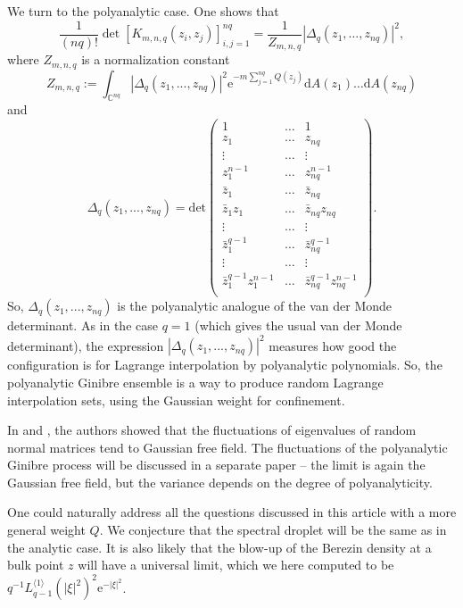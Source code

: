 \documentclass{birkart}
\theoremstyle{definition}
\theoremstyle{remark}
\numberwithin{equation}{section}
\numberwithin{figure}{section}
\newcommand{\e}{\mathrm e}
\newcommand{\1}{{\mathbf 1}}
\newcommand{\Rpar}{q}
\newcommand{\C}{{\mathbb C}}
\newcommand{\diff}{{\mathrm d}}
\begin{document}
We turn to the polyanalytic case. One shows that 
\[ 
\frac{1}{(n\Rpar)!} \det[K_{m,n,\Rpar}(z_i,z_j)]_{i,j=1}^{n\Rpar} 
= \frac{1}{Z_{m,n,\Rpar}}| \Delta_\Rpar(z_1,...,z_{n\Rpar})|^2, \]
where $Z_{m,n,\Rpar}$ is a normalization constant  
\[ 
Z_{m,n,\Rpar}:=
\int_{\C^{n\Rpar}}|\Delta_\Rpar(z_1,...,z_{n\Rpar})|^2
\e^{-m \sum_{j=1}^{n\Rpar}Q(z_j)}
\diff A(z_1) \dots \diff A(z_{n\Rpar})
\]
and 
\[ 
\Delta_\Rpar(z_1,...,z_{n\Rpar}) = 
\mathrm{det} \left( 
\begin{array}{ccc}
1 & \dots  & 1 
\\
z_1 & \dots & z_{n\Rpar} 
\\
\vdots & \dots & \vdots 
\\
z_1^{n-1} & \dots & z_{n\Rpar}^{n-1} 
\\
\bar{z}_1&\dots &  \bar{z}_{n\Rpar}
\\
\bar{z}_1z_1&\dots &  \bar{z}_{n\Rpar}z_{n\Rpar}
\\ 
\vdots & \dots & \vdots 
\\
\bar{z}_1^{\Rpar-1}&\dots &  \bar{z}_{n\Rpar}^{\Rpar-1}
\\
\vdots & \dots & \vdots 
\\
\bar{z}_1^{\Rpar-1}z_1^{n-1}&\dots &  \bar{z}_{n\Rpar}^{\Rpar-1}
z_{n\Rpar}^{n-1}
\\ 
\end{array} 
\right).
\] 
So, $\Delta_\Rpar(z_1,...,z_{n\Rpar})$ is the polyanalytic analogue 
of the van der Monde determinant. As in the case $\Rpar=1$ (which gives 
the usual van der Monde determinant), the expression 
$|\Delta_\Rpar(z_1,...,z_{n\Rpar})|^2$ measures how good the configuration 
is for Lagrange interpolation by polyanalytic polynomials. So, the 
polyanalytic Ginibre ensemble is a way to produce random Lagrange
interpolation sets, using the Gaussian weight for confinement.
\medskip
 
In \cite{rv} and \cite{ahm2}, the authors showed that the fluctuations of 
eigenvalues of random normal matrices tend to Gaussian free field.
The fluctuations of the polyanalytic Ginibre process will be discussed in 
a separate paper -- the limit is again the Gaussian free field, but the 
variance depends on the degree of polyanalyticity. 

One could naturally address all the questions discussed in this article with 
a more general weight $Q$. We conjecture that the spectral droplet will be the 
same as in the analytic case. It is also likely that the blow-up of the 
Berezin density at a bulk point $z$ will have a universal limit, which we 
here computed to be 
$\Rpar^{-1}L^{\langle1\rangle}_{\Rpar-1}(|\xi|^2)^2\e^{-|\xi|^2}$.   
\end{document}
